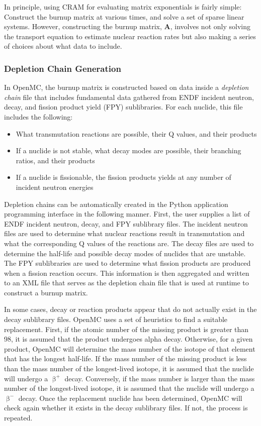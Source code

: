 \documentclass[3p,authoryear]{elsarticle}
\newcommand{\vect}[1]{\mathbf{#1}} %
\begin{document}
In principle, using CRAM for evaluating matrix exponentials is fairly simple:
Construct the burnup matrix at various times, and solve a set of sparse linear
systems. However, constructing the burnup matrix, $\vect{A}$, involves not only
solving the transport equation to estimate nuclear reaction rates but also
making a series of choices about what data to include.

\subsubsection{Depletion Chain Generation}
\label{sec:depletion-chain}

In OpenMC, the burnup matrix is constructed based on data inside a
\emph{depletion chain} file that includes fundamental data gathered from ENDF
incident neutron, decay, and fission product yield (FPY) sublibraries. For each
nuclide, this file includes the following:
\begin{itemize}
  \item What transmutation reactions are possible, their Q values, and their
  products
  \item If a nuclide is not stable, what decay modes are possible, their
  branching ratios, and their products
  \item If a nuclide is fissionable, the fission products yields at any number
  of incident neutron energies
\end{itemize}

Depletion chains can be automatically created in the Python application
programming interface in the following manner. First, the user supplies a list
of ENDF incident neutron, decay, and FPY sublibrary files. The incident neutron
files are used to determine what nuclear reactions result in transmutation and
what the corresponding Q values of the reactions are. The decay files are used
to determine the half-life and possible decay modes of nuclides that are
unstable. The FPY sublibraries are used to determine what fission products are
produced when a fission reaction occurs. This information is then aggregated and
written to an XML file that serves as the depletion chain file that is used at
runtime to construct a burnup matrix.

In some cases, decay or reaction products appear that do not actually exist in
the decay sublibrary files. OpenMC uses a set of heuristics to find a suitable
replacement. First, if the atomic number of the missing product is greater than
98, it is assumed that the product undergoes alpha decay. Otherwise, for a given
product, OpenMC will determine the mass number of the isotope of that element
that has the longest half-life. If the mass number of the missing product is
less than the mass number of the longest-lived isotope, it is assumed that the
nuclide will undergo a $\upbeta^+$ decay. Conversely, if the mass number is
larger than the mass number of the longest-lived isotope, it is assumed that the
nuclide will undergo a $\upbeta^-$ decay. Once the replacement nuclide has been
determined, OpenMC will check again whether it exists in the decay sublibrary
files. If not, the process is repeated.
\end{document}
